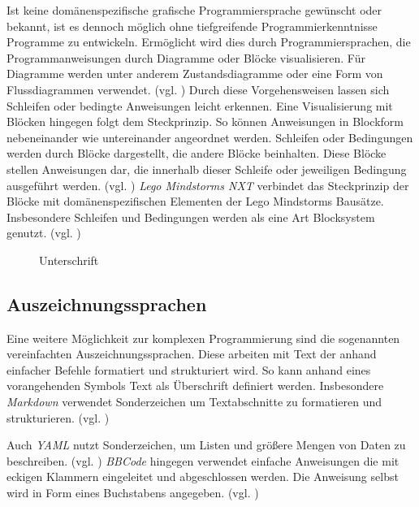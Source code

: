 Ist keine domänenspezifische grafische Programmiersprache gewünscht oder bekannt, ist es dennoch möglich ohne tiefgreifende Programmierkenntnisse Programme zu entwickeln. Ermöglicht wird dies durch Programmiersprachen, die Programmanweisungen durch Diagramme oder Blöcke visualisieren. Für Diagramme werden unter anderem Zustandsdiagramme oder eine Form von Flussdiagrammen verwendet. (vgl. \cite{SwissEdu45:online} \cite{DRAKONEd12:online} \cite{PureData15:online}) Durch diese Vorgehensweisen lassen sich Schleifen oder bedingte Anweisungen leicht erkennen. Eine Visualisierung mit Blöcken hingegen folgt dem Steckprinzip. So können Anweisungen in Blockform nebeneinander wie untereinander angeordnet werden. Schleifen oder Bedingungen werden durch Blöcke dargestellt, die andere Blöcke beinhalten. Diese Blöcke stellen Anweisungen dar, die innerhalb dieser Schleife oder jeweiligen Bedingung ausgeführt werden. (vgl. \cite{BlocklyG18:online} \cite{NXTSoftw71:online} \cite{SnapBuil34:online} \cite{squeakla50:online}) \emph{Lego Mindstorms NXT} verbindet das Steckprinzip der Blöcke mit domänenspezifischen Elementen der Lego Mindstorms Bausätze. Insbesondere Schleifen und Bedingungen werden als eine Art Blocksystem genutzt. (vgl. \cite{NXTSoftw71:online})

\begin{figure}[h]
\centering
{}
\caption{Unterschrift}
\label{methVorgehen}
\end{figure}

\subsection{Auszeichnungssprachen}
Eine weitere Möglichkeit zur komplexen Programmierung sind die sogenannten vereinfachten Auszeichnungssprachen. Diese arbeiten mit Text der anhand einfacher Befehle formatiert und strukturiert wird. So kann anhand eines vorangehenden Symbols Text als Überschrift definiert werden. Insbesondere \emph{Markdown} verwendet Sonderzeichen um Textabschnitte zu formatieren und strukturieren. (vgl. \cite{GettingS56:online}) 

Auch \emph{YAML} nutzt Sonderzeichen, um Listen und größere Mengen von Daten zu beschreiben. (vgl. \cite{TheOffic64:online}) \emph{BBCode} hingegen verwendet einfache Anweisungen die mit eckigen Klammern eingeleitet und abgeschlossen werden. Die Anweisung selbst wird in Form eines Buchstabens angegeben. (vgl. \cite{BBCodeor24:online})

